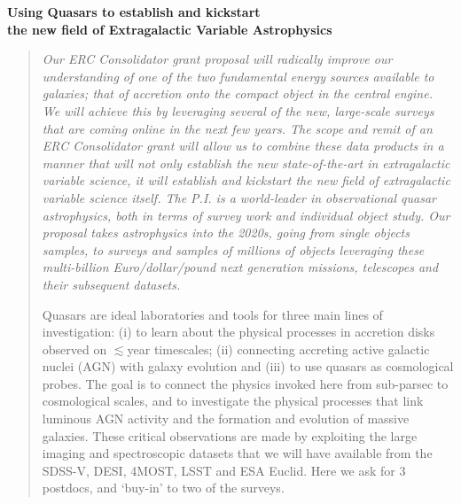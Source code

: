 \documentclass[oneside, a4paper, onecolumn, 11pt]{article}
\begin{document}
\begin{center}
 {\Large \bf \textcolor{Cerulean}{Using Quasars to establish and kickstart \\}}
\vspace{4pt} 
  {\Large \bf \textcolor{Cerulean}{the new field of Extragalactic Variable Astrophysics} }
\end{center}

\begin{quotation}
\noindent
{\it 
Our ERC Consolidator grant proposal will radically improve our understanding of 
one of the two fundamental energy sources available to galaxies; that of accretion 
onto the compact object in the central engine. We will achieve this by leveraging 
several of the new, large-scale surveys that are coming online in the next few years. 
The scope and remit of an ERC Consolidator grant will allow us to combine these 
data products in a manner that will 
not only establish the new state-of-the-art in extragalactic variable science, 
{\rm it will establish and kickstart the new field of extragalactic variable science itself}. 
The P.I. is a world-leader in observational quasar astrophysics, both in terms of 
survey work and individual object study. 
Our proposal takes astrophysics into the 2020s, going from single objects samples, 
to surveys and samples of millions of objects leveraging these multi-billion Euro/dollar/pound  
next generation missions, telescopes and their subsequent datasets. 

\noindent
Quasars are ideal laboratories and tools for
three main lines of investigation: {\rm (i)} to learn about the
physical processes in accretion disks observed on $\lesssim$year
timescales; {\rm (ii)} connecting accreting active galactic nuclei
(AGN) with galaxy evolution and {\rm (iii)} to use quasars as
cosmological probes. 
The goal is to connect the physics invoked here
from sub-parsec to cosmological scales, and to investigate the
physical processes that link luminous AGN activity and the formation
and evolution of massive galaxies. These critical observations are
made by exploiting the large imaging and spectroscopic datasets that
we will have available from the 
SDSS-V, DESI,  4MOST, LSST and ESA Euclid. 
Here we ask for 3 postdocs, and `buy-in' to two of the surveys. 
}
\noindent
\end{quotation}

\end{document}
